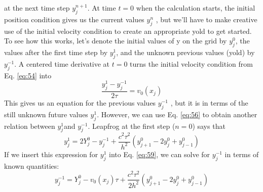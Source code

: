 at the next time step $ y_j^{n+1}$. At time $t = 0$ when the calculation starts, the initial
position condition gives us the current values $ y_j^n$ , but we\rq ll have to make creative
use of the initial velocity condition to create an appropriate yold to get started.
To see how this works, let\rq s denote the initial values of y on the grid by $ y_j^0 $, the
values after the first time step by $ y_j^{1} $, and the unknown previous values (yold) by
$ y_j^{-1} $. A centered time derivative at $t = 0$ turns the initial velocity condition from
Eq. \ref{eq:54} into
\begin{equation}\label{eq:59}
\frac{y_j^1 - y_j^{-1}}{2 \tau} = v_0(x_j)
\end{equation}
This gives us an equation for the previous values $y_j^{-1}$ , but it is in terms of the
still unknown future values $y_j^{1}$. However, we can use Eq. \ref{eq:56} to obtain another
relation between $y_j^{1}$and $y_j^{-1}$. Leapfrog at the first step ($n = 0$) says that
\begin{equation}\label{eq:510}
y_j^1 = 2Y^0_j - y_j^{-1} + \frac{c^2 \tau^2}{h^2}(y^0_{j+1}-2y^0_j+y^0_{j-1})
\end{equation}
If we insert this expression for $y^1_j$ into Eq. \ref{eq:59}, we can solve for $y^{-1}_j $ in terms of
known quantities:
\begin{equation}\label{eq:511}
y_j^{-1} = Y^0_j - v_0(x_j)\tau + \frac{c^2 \tau^2}{2h^2}(y^0_{j+1}-2y^0_j+y^0_{j-1})
\end{equation}

